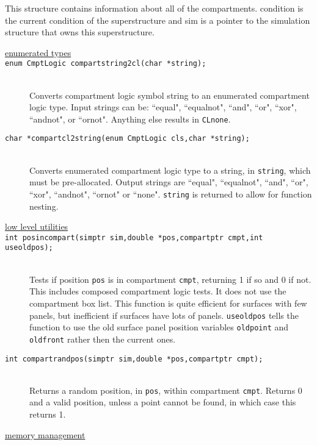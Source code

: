 \documentclass {book}
\begin{document}
This structure contains information about all of the compartments.  condition is the current condition of the superstructure and sim is a pointer to the simulation structure that owns this superstructure.

\begin{description}

\item[\underline{enumerated types}]

\item[\texttt{enum CmptLogic compartstring2cl(char *string);}]
\hfill \\
Converts compartment logic symbol string to an enumerated compartment logic type.  Input strings can be: ``equal", ``equalnot", ``and", ``or", ``xor", ``andnot", or ``ornot".  Anything else results in \texttt{CLnone}.

\item[\texttt{char *compartcl2string(enum CmptLogic cls,char *string);}]
\hfill \\
Converts enumerated compartment logic type to a string, in \texttt{string}, which must be pre-allocated.  Output strings are ``equal", ``equalnot", ``and", ``or", ``xor", ``andnot", ``ornot" or ``none".  \texttt{string} is returned to allow for function nesting.

\item[\underline{low level utilities}]

\item[\texttt{int posincompart(simptr sim,double *pos,compartptr cmpt,int useoldpos);}]
\hfill \\
Tests if position \texttt{pos} is in compartment \texttt{cmpt}, returning 1 if so and 0 if not.  This includes composed compartment logic tests.  It does not use the compartment box list.  This function is quite efficient for surfaces with few panels, but inefficient if surfaces have lots of panels.  \texttt{useoldpos} tells the function to use the old surface panel position variables \texttt{oldpoint} and \texttt{oldfront} rather then the current ones.

\item[\texttt{int compartrandpos(simptr sim,double *pos,compartptr cmpt);}]
\hfill \\
Returns a random position, in \texttt{pos}, within compartment \texttt{cmpt}.  Returns 0 and a valid position, unless a point cannot be found, in which case this returns 1.

\item[\underline{memory management}]


\end{description}
\end{document}
